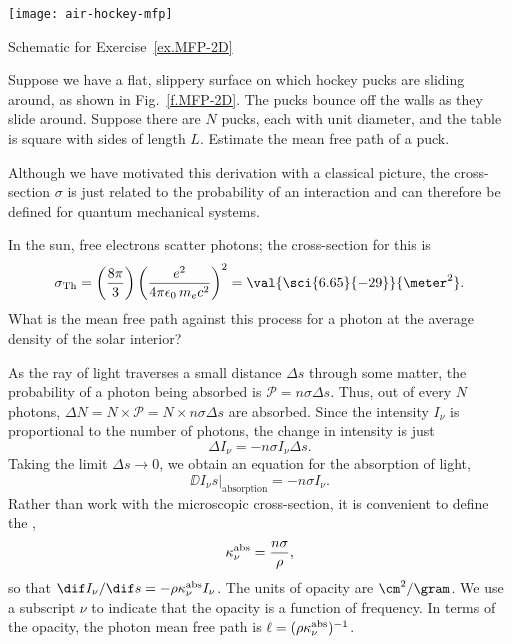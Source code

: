 \begin{marginfigure}[3\baselineskip]
    \texttt{[image: air-hockey-mfp]}
    \caption[Mean free path of a hockey puck]{\label{f.MFP-2D}Schematic for Exercise~\ref{ex.MFP-2D}}
\end{marginfigure}
\begin{exercisebox}\label{ex.MFP-2D}
    Suppose we have a flat, slippery surface on which hockey pucks are sliding around, as shown in Fig.~\ref{f.MFP-2D}. The pucks bounce off the walls as they slide around.  Suppose there are $N$ pucks, each with unit diameter, and the table is square with sides of length $L$.  Estimate the mean free path of a puck.
\end{exercisebox}

Although we have motivated this derivation with a classical picture, the cross-section $\sigma$ is just related to the probability of an interaction and can therefore be defined for quantum mechanical systems.

\begin{exercisebox}\label{ex.MFP}
    In the sun, free electrons scatter photons; the cross-section for this is
    \[
    \sigma_{\mathrm{Th}} = \left(\frac{8\pi}{3}\right)\left(\frac{e^2}{4\pi\epsilon_{0}\,m_e c^2}\right)^2 = \val{\sci{6.65}{-29}}{\meter^2}.
    \]
    What is the mean free path against this process for a photon at the average density of the solar interior?
\end{exercisebox}

As the ray of light traverses a small distance $\Delta s$ through some matter, the probability of a photon being absorbed is $\mathcal{P} = n\sigma\Delta s$. Thus, out of every $N$ photons, $\Delta N = N \times\mathcal{P} = N\times n\sigma\Delta s$ are absorbed. Since the intensity $I_{\nu}$ is proportional to the number of photons, the change in intensity is just
\[ \Delta I_{\nu} = -n\sigma I_{\nu}\Delta s. \]
Taking the limit $\Delta s\to0$, we obtain an equation for the absorption of light,
\begin{equation}\label{e.absorption-microscopic}
\left.\DD{I_{\nu}}{s}\right|_{\mathrm{absorption}} = -n\sigma I_{\nu}.
\end{equation}
Rather than work with the microscopic cross-section, it is convenient to define the ,
\[
	\kappa_\nu^{\mathrm{abs}} = \frac{n\sigma}{\rho},
\]
so that $\dif I_{\nu}/\dif s = -\rho\kapabs I_{\nu}$. The units of opacity are $\cm^{2}/\gram$. We use a subscript $\nu$ to indicate that the opacity is a function of frequency. In terms of the opacity, the photon mean free path is $\ell = (\rho\kappa_\nu^{\mathrm{abs}})^{-1}$.


